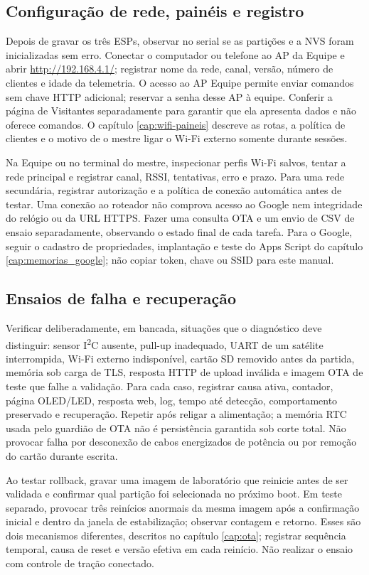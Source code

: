 \subsection{Configuração de rede, painéis e registro}\label{sec:config-operacional}
Depois de gravar os três ESPs, observar no serial se as partições e a NVS foram inicializadas sem erro. Conectar o computador ou telefone ao AP da Equipe e abrir \url{http://192.168.4.1/}; registrar nome da rede, canal, versão, número de clientes e idade da telemetria. O acesso ao AP Equipe permite enviar comandos sem chave HTTP adicional; reservar a senha desse AP à equipe. Conferir a página de Visitantes separadamente para garantir que ela apresenta dados e não oferece comandos. O capítulo \ref{cap:wifi-paineis} descreve as rotas, a política de clientes e o motivo de o mestre ligar o Wi-Fi externo somente durante sessões.

Na Equipe ou no terminal do mestre, inspecionar perfis Wi-Fi salvos, tentar a rede principal e registrar canal, RSSI, tentativas, erro e prazo. Para uma rede secundária, registrar autorização e a política de conexão automática antes de testar. Uma conexão ao roteador não comprova acesso ao Google nem integridade do relógio ou da URL HTTPS. Fazer uma consulta OTA e um envio de CSV de ensaio separadamente, observando o estado final de cada tarefa. Para o Google, seguir o cadastro de propriedades, implantação e teste do Apps Script do capítulo \ref{cap:memorias_google}; não copiar token, chave ou SSID para este manual.

\subsection{Ensaios de falha e recuperação}\label{sec:ensaios-falha}
Verificar deliberadamente, em bancada, situações que o diagnóstico deve distinguir: sensor I\textsuperscript{2}C ausente, pull-up inadequado, UART de um satélite interrompida, Wi-Fi externo indisponível, cartão SD removido antes da partida, memória sob carga de TLS, resposta HTTP de upload inválida e imagem OTA de teste que falhe a validação. Para cada caso, registrar causa ativa, contador, página OLED/LED, resposta web, log, tempo até detecção, comportamento preservado e recuperação. Repetir após religar a alimentação; a memória RTC usada pelo guardião de OTA não é persistência garantida sob corte total. Não provocar falha por desconexão de cabos energizados de potência ou por remoção do cartão durante escrita.

Ao testar rollback, gravar uma imagem de laboratório que reinicie antes de ser validada e confirmar qual partição foi selecionada no próximo boot. Em teste separado, provocar três reinícios anormais da mesma imagem após a confirmação inicial e dentro da janela de estabilização; observar contagem e retorno. Esses são dois mecanismos diferentes, descritos no capítulo \ref{cap:ota}; registrar sequência temporal, causa de reset e versão efetiva em cada reinício. Não realizar o ensaio com controle de tração conectado.


